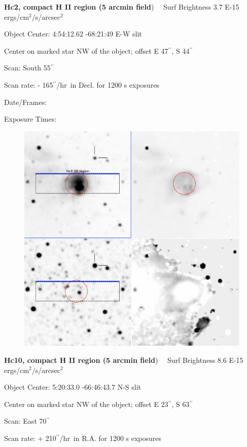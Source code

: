 \documentclass[11pt]{article}
\newcommand{\arcsec}{$^{\prime\prime}$}
\begin{document}
\newpage 
 
 
{\bf Hc2, compact H II region (5 arcmin field})   \ \   Surf Brightness 3.7 E-15 ergs/cm$^2/$s/arcsec$^2$

Object Center:  4:54:12.62   -68:21:49   E-W slit

Center on marked star NW of the object; offset E 47\arcsec,  S 44\arcsec

Scan:  South 55\arcsec

Scan rate:  - 165\arcsec/hr\ in Decl. for 1200 s exposures

Date/Frames:

Exposure Times:  

\begin{figure}
\includegraphics[width=12.5cm]{snapshots/Hc2_HII_5arcmin.png}
\end{figure}

\newpage 
 
{\bf Hc10, compact H II region (5 arcmin field})   \ \   Surf Brightness 8.6 E-15 ergs/cm$^2/$s/arcsec$^2$

Object Center:  5:20:33.0    -66:46:43.7   N-S slit

Center on marked star NW of the object; offset E 23\arcsec,  S 63\arcsec

Scan:    East 70\arcsec

Scan rate:  + 210\arcsec/hr\ in R.A. for 1200 s exposures
\end{document}
